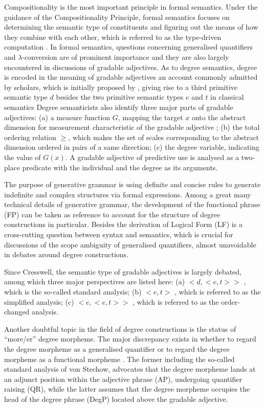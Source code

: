 \documentclass{ctexart}
\let \cite \parencite
\begin{document}
\noindent
Compositionality is the most important principle in formal semantics. Under the guidance of the Compositionality Principle, formal semantics focuses on determining the semantic type of constituents and figuring out the means of how they combine with each other, which is referred to as the type-driven computation \cite{pan1998}. In formal semantics, questions concerning generalised quantifiers and $\lambda$-conversion are of prominent importance and they are also largely encountered in discussions of gradable adjectives. As to degree semantics, degree is encoded in the meaning of gradable adjectives an account commonly admitted by scholars, which is initially proposed by \cite{cresswell1976}, giving rise to a third primitive semantic type $d$ besides the two primitive semantic types $e$ and $t$ in classical semantics Degree semanticists also identify three major parts of gradable adjectives: (a) a measure function $G$, mapping the target $x$ onto the abstract dimension for measurement characteristic of the gradable adjective \cite{bartsch1974}; (b) the total ordering relation $\geq$, which makes the set of scales corresponding to the abstract dimension ordered in pairs of a same direction; (c) the degree variable, indicating the value of $G(x)$. A gradable adjective of predictive use is analysed as a two-place predicate with the individual and the degree as its arguments.

The purpose of generative grammar is using definite and concise rules to generate indefinite and complex structures via formal expressions. Among a great many technical details of generative grammar, the development of the functional phrase (FP) can be taken as reference to account for the structure of degree constructions in particular. Besides the derivation of Logical Form (LF) is a cross-cutting question between syntax and semantics, which is crucial for discussions of the scope ambiguity of generalised quantifiers, almost unavoidable in debates around degree constructions.

Since Cresswell, the semantic type of gradable adjectives is largely debated, among which three major perspectives are listed here: 
(a) $<d,<e,t>>$ \cite{von1984a}, which is the so-called standard analysis; 
(b) $<e,t>$ \cite{kennedy1997}, which is referred to as the simplified analysis;
(c) $<e,<e,t>>$ \cite{rett2008}, which is referred to as the order-changed analysis.

Another doubtful topic in the field of degree constructions is the status of “more/er” degree morpheme. The major discrepancy exists in whether to regard the degree morpheme as a generalised quantifier \cite{von1984a,heim1985,bhatt2004} or to regard the degree morpheme as a functional morpheme \cite{bierwisch1989,corver1990,corver1993,corver1997a,kennedy1997} . The former including the so-called standard analysis of von Stechow, advocates that the degree morpheme lands at an adjunct position within the adjective phrase (AP), undergoing quantifier raising (QR), while the latter assumes that the degree morpheme occupies the head of the degree phrase (DegP) located above the gradable adjective.
\end{document}
